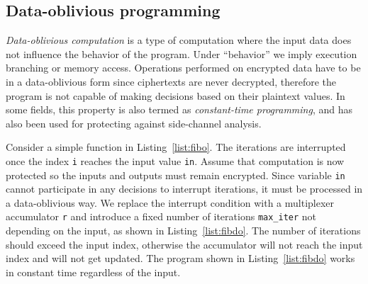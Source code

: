 


\subsection{Data-oblivious programming}

{\it Data-oblivious computation} is a type of computation where the input data does not influence the behavior of the program. Under ``behavior'' we imply execution branching or memory access. 
Operations performed on encrypted data have to be in a data-oblivious form since ciphertexts are never decrypted, therefore the program is not capable of making decisions based on their plaintext values. In some fields, this property is also termed as {\it constant-time programming}, and has also been used for protecting against side-channel analysis.


Consider a simple function in Listing~\ref{list:fibo}. The iterations are interrupted once the index {\tt i} reaches the input value \texttt{in}. Assume that computation is now protected so the inputs and outputs must remain encrypted. Since variable {\tt in} cannot participate in any decisions to interrupt iterations, it must be processed in a data-oblivious way. We replace the interrupt condition with a multiplexer accumulator {\tt r} and introduce a fixed number of iterations {\tt max\_iter} not depending on the input, as shown in Listing~\ref{list:fibdo}. The number of iterations should exceed the input index, otherwise the accumulator will not reach the input index and will not get updated. The program shown in Listing~\ref{list:fibdo} works in constant time regardless of the input.

